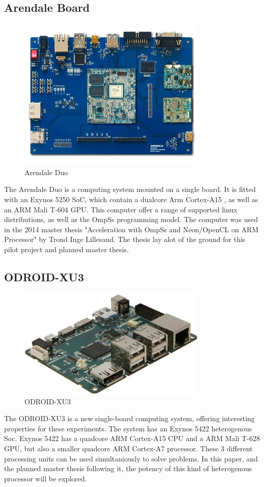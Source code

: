 \subsection{Arendale Board} \label{ArendaleBoard}
\begin{figure}[ht!]
  \centering
  \includegraphics[width=90mm]{fig/Arendale.jpg}
  \caption{Arendale Duo \label{overflow}}
\end{figure}
The Arendale Duo is a computing system mounted on a single board.
It is fitted with an Exynos 5250 SoC, which contain a dualcore Arm Cortex-A15 , as well as an ARM Mali T-604 GPU.
This computer offer a range of supported linux distributions, as well as the OmpSs programming model.
The computer was used in the 2014 master thesis "Acceleration with OmpSs and Neon/OpenCL on ARM Processor" by Trond Inge Lillesand.
The thesis lay alot of the ground for this pilot project and planned master thesis.

\subsection{ODROID-XU3} \label{OdroidXU3}
\begin{figure}[ht!]
  \centering
  \includegraphics[width=90mm]{fig/ODROID.jpg}
  \caption{ODROID-XU3 \label{overflow}}
\end{figure}
The ODROID-XU3 is a new single-board computing system, offering interesting properties for these experiments.
The system has an Exynos 5422 heterogenous Soc.
Exynos 5422 has a quadcore ARM Cortex-A15 CPU and a ARM Mali T-628 GPU, but also a smaller quadcore ARM Cortex-A7 processor.
These 3 different processing units can be used simultaniously to solve problems.
In this paper, and the planned master thesis following it, the potency of this kind of heterogenous processor will be explored.

